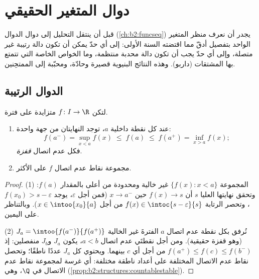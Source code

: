 \chapter{دوال المتغير الحقيقي}\label{ch:b2:realfun}

قبل أن ينتقل التحليل إلى دوال الدوال (\cref{ch:b2:funcseq})
يجدر أن نعرف منظر المتغير الواحد بتفصيل أدقّ مما
اقتضته السنة الأولى: إلى أي حدّ يمكن أن تكون دالة رتيبة غير متصلة، وإلى
أي حدّ يجب أن تكون دالة محدبة منتظمة، وما الخواص الخاصة التي
تتمتع بها المشتقات (داربو). وهذه النتائج البنيوية قصيرة
وحادّة، ومحبّبة إلى الممتحِنين.

\section{الدوال الرتيبة}

\begin{theorem}\label{thm:b2:realfun:monotone}
لتكن $f \colon I \to \R$ متزايدة على فترة.
\begin{enumerate}
  \item عند كل نقطة داخلية $a$، توجد النهايتان من جهة واحدة:
        \[
        f(a^-) = \sup_{x < a} f(x) \;\leq\; f(a) \;\leq\;
        f(a^+) = \inf_{x > a} f(x) ;
        \]
        فكل عدم اتصال \emph{قفزة}.
  \item مجموعة نقاط عدم اتصال $f$  على
        الأكثر.
\end{enumerate}
\end{theorem}

\begin{proof}
(1) المجموعة $\{f(x) : x < a\}$ غير خالية ومحدودة من أعلى بالمقدار $f(a)$:
وتحقق نهايتها العليا $s$ أن $f(x) \to s$ حين $x \to a^-$ (فمن أجل
$\varepsilon$، يوجد $f(x_0) > s - \varepsilon$، وتحصر الرتابة
$f(x) \in \intoc{s - \varepsilon}{s}$ من أجل $x \in
\intoo{x_0}{a}$). وبالتناظر على اليمين.

(2) نُرفق بكل نقطة عدم اتصال $a$ الفترةَ  غير الخالية
$J_a = \intoo{f(a^-)}{f(a^+)}$ (وهو قفزة حقيقية). ومن أجل نقطتَي
عدم اتصال $a < b$، يكون $J_a$ و$J_b$ منفصلين: إذ $f(a^+) \leq f(c)
\leq f(b^-)$ من أجل أي $c$ بينهما. ويحتوي كل $J_a$ عددًا ناطقًا؛
وتحصل نقاط عدم الاتصال المختلفة على أعداد ناطقة مختلفة: أي غرسة
لمجموعة نقاط عدم الاتصال في $\Q$، وهي 
(\cref{prop:b2:structures:countablestable}).
\end{proof}

